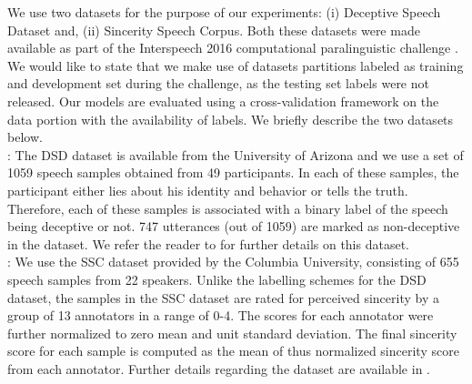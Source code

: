 \documentclass{article}
\begin{document}
We use two datasets for the purpose of our experiments: (i) Deceptive Speech Dataset and, (ii) Sincerity Speech Corpus.
Both these datasets were made available as part of the Interspeech 2016 computational paralinguistic challenge \cite{schuller2016interspeech}.
We would like to state that we make use of datasets partitions labeled as training and development set during the challenge, as the testing set labels were not released.
Our models are evaluated using a cross-validation framework on the data portion with the availability of labels. 
We briefly describe the two datasets below.\\ 

:
The DSD dataset is available from the University of Arizona and we use a set of 1059 speech samples obtained from 49 participants.
In each of these samples, the participant either lies about his identity and behavior or tells the truth. 
Therefore, each of these samples is associated with a binary label of the speech being deceptive or not.
747 utterances (out of 1059) are marked as non-deceptive in the dataset.
We refer the reader to \cite{schuller2016interspeech} for further details on this dataset.\\ 

:
We use the SSC dataset provided by the Columbia University, consisting of 655 speech samples from 22 speakers.
Unlike the labelling schemes for the DSD dataset, the samples in the SSC dataset are rated for perceived sincerity by a group of 13 annotators in a range of 0-4. 
The scores for each annotator were further normalized to zero mean and unit standard deviation.
The final sincerity score for each sample is computed as the mean of thus normalized sincerity score from each annotator.
Further details regarding the dataset are available in \cite{schuller2016interspeech}.
\end{document}
